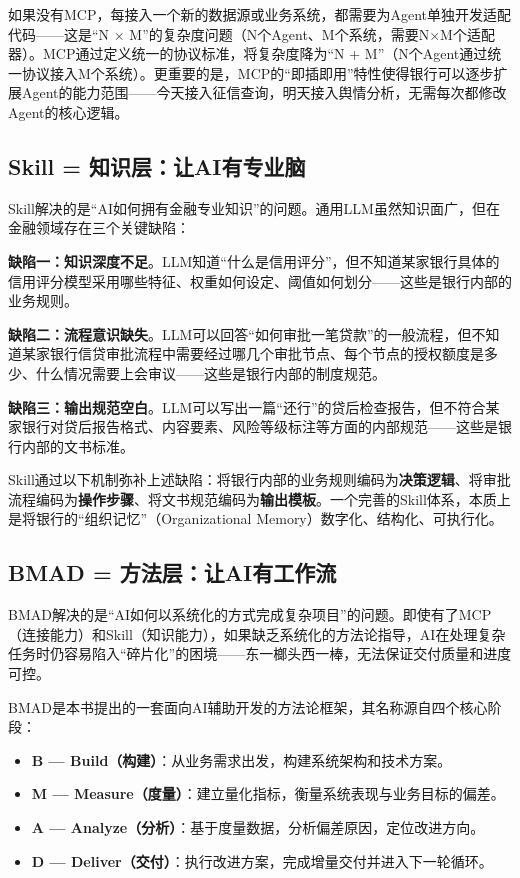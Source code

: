 如果没有MCP，每接入一个新的数据源或业务系统，都需要为Agent单独开发适配代码——这是``N $\times$ M''的复杂度问题（N个Agent、M个系统，需要N$\times$M个适配器）。MCP通过定义统一的协议标准，将复杂度降为``N + M''（N个Agent通过统一协议接入M个系统）。更重要的是，MCP的``即插即用''特性使得银行可以逐步扩展Agent的能力范围——今天接入征信查询，明天接入舆情分析，无需每次都修改Agent的核心逻辑。

\subsection{Skill = 知识层：让AI有专业脑}

Skill解决的是``AI如何拥有金融专业知识''的问题。通用LLM虽然知识面广，但在金融领域存在三个关键缺陷：

\textbf{缺陷一：知识深度不足}。LLM知道``什么是信用评分''，但不知道某家银行具体的信用评分模型采用哪些特征、权重如何设定、阈值如何划分——这些是银行内部的业务规则。

\textbf{缺陷二：流程意识缺失}。LLM可以回答``如何审批一笔贷款''的一般流程，但不知道某家银行信贷审批流程中需要经过哪几个审批节点、每个节点的授权额度是多少、什么情况需要上会审议——这些是银行内部的制度规范。

\textbf{缺陷三：输出规范空白}。LLM可以写出一篇``还行''的贷后检查报告，但不符合某家银行对贷后报告格式、内容要素、风险等级标注等方面的内部规范——这些是银行内部的文书标准。

Skill通过以下机制弥补上述缺陷：将银行内部的业务规则编码为\textbf{决策逻辑}、将审批流程编码为\textbf{操作步骤}、将文书规范编码为\textbf{输出模板}。一个完善的Skill体系，本质上是将银行的``组织记忆''（Organizational Memory）数字化、结构化、可执行化。

\subsection{BMAD = 方法层：让AI有工作流}

BMAD解决的是``AI如何以系统化的方式完成复杂项目''的问题。即使有了MCP（连接能力）和Skill（知识能力），如果缺乏系统化的方法论指导，AI在处理复杂任务时仍容易陷入``碎片化''的困境——东一榔头西一棒，无法保证交付质量和进度可控。

BMAD是本书提出的一套面向AI辅助开发的方法论框架，其名称源自四个核心阶段：

\begin{itemize}[leftmargin=2em]
  \item \textbf{B — Build（构建）}：从业务需求出发，构建系统架构和技术方案。
  \item \textbf{M — Measure（度量）}：建立量化指标，衡量系统表现与业务目标的偏差。
  \item \textbf{A — Analyze（分析）}：基于度量数据，分析偏差原因，定位改进方向。
  \item \textbf{D — Deliver（交付）}：执行改进方案，完成增量交付并进入下一轮循环。
\end{itemize}


